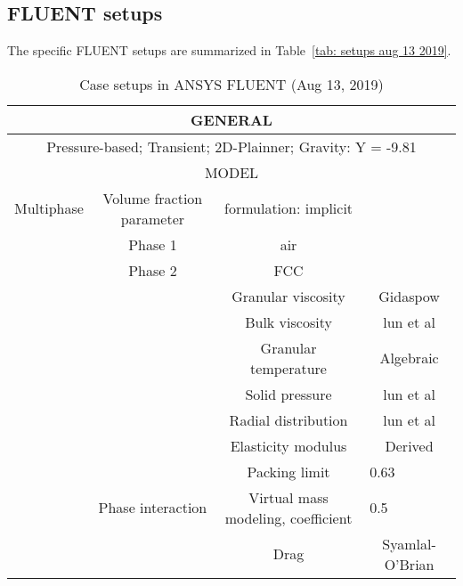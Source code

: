 \subsection{FLUENT setups}
The specific FLUENT setups are summarized in Table~\ref{tab: setups aug 13 2019}.  
\begin{table}[htbp]
  \centering
  \caption{Case setups in ANSYS FLUENT (Aug 13, 2019)}
    \begin{tabular}{cccc}
      \toprule
    \multicolumn{4}{p{43.665em}}{GENERAL} \\
      \midrule
    \multicolumn{4}{p{43.665em}}{Pressure-based; Transient; 2D-Plainner; Gravity: Y = -9.81} \\
      \midrule
    \multicolumn{4}{p{43.665em}}{MODEL} \\
      \midrule
    \multicolumn{1}{p{10em}}{Multiphase} & \multicolumn{1}{p{14.415em}}{Volume fraction parameter} & \multicolumn{1}{p{11.25em}}{formulation: implicit} &  \\
          & \multicolumn{1}{p{14.415em}}{Phase 1} & \multicolumn{1}{p{11.25em}}{air} &  \\
          & \multicolumn{1}{p{14.415em}}{Phase 2} & \multicolumn{1}{p{11.25em}}{FCC} &  \\
          &       & \multicolumn{1}{p{11.25em}}{Granular viscosity} & \multicolumn{1}{p{8em}}{Gidaspow} \\
          &       & \multicolumn{1}{p{11.25em}}{Bulk viscosity} & \multicolumn{1}{p{8em}}{lun et al} \\
          &       & \multicolumn{1}{p{11.25em}}{Granular temperature} & \multicolumn{1}{p{8em}}{Algebraic} \\
          &       & \multicolumn{1}{p{11.25em}}{Solid pressure} & \multicolumn{1}{p{8em}}{lun et al} \\
          &       & \multicolumn{1}{p{11.25em}}{Radial distribution} & \multicolumn{1}{p{8em}}{lun et al} \\
          &       & \multicolumn{1}{p{11.25em}}{Elasticity modulus} & \multicolumn{1}{p{8em}}{Derived} \\
          &       & \multicolumn{1}{p{11.25em}}{Packing limit} & \multicolumn{1}{l}{0.63} \\
          & \multicolumn{1}{p{14.415em}}{Phase interaction} & \multicolumn{1}{p{11.25em}}{Virtual mass modeling, coefficient} & \multicolumn{1}{l}{0.5} \\
          &       & \multicolumn{1}{p{11.25em}}{Drag} & \multicolumn{1}{p{8em}}{Syamlal-O'Brian} \\

\end{tabular}
\end{table}
